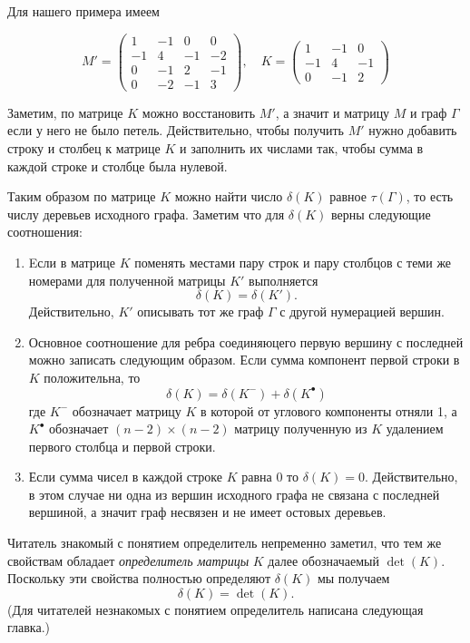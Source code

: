 \documentclass{article}
\begin{document}
Для нашего примера имеем

\[M'=\left(
\begin{matrix}
1&-1&0&0
\\
-1&4&-1&-2
\\
0&-1&2&-1
\\
0&-2&-1&3
\end{matrix}\right),
\quad 
K=\left(
\begin{matrix}
1&-1&0
\\
-1&4&-1
\\
0&-1&2
\end{matrix}
\right)\]

Заметим, по матрице $K$ можно восстановить $M'$, а значит и матрицу $M$ и граф $\Gamma$ если у него не было петель.
Действительно, чтобы получить $M'$ нужно добавить строку и столбец к матрице $K$ и заполнить их числами так, чтобы сумма в каждой строке и столбце была нулевой.

Таким образом по матрице $K$ можно найти число $\delta(K)$ равное $\tau(\Gamma)$, то есть числу деревьев исходного графа.
Заметим что для $\delta(K)$ верны следующие соотношения:
\begin{enumerate}
\item Eсли в матрице $K$ поменять местами пару строк и пару столбцов с теми же номерами
для полученной матрицы $K'$ выполняется 
\[\delta(K)=\delta(K').\]
Действительно, $K'$ описывать тот же граф $\Gamma$ с другой нумерацией вершин.
\item Основное соотношение для ребра соединяюцего первую вершину с последней можно записать следующим образом.
Если сумма компонент первой строки в $K$ положительна, то
\[\delta(K)=\delta(K^{-})+\delta(K^{\bullet})\]
где $K^{-}$ обозначает матрицу $K$ в которой от углового компоненты отняли 1, а $K^{\bullet}$ обозначает $(n-2)\times(n-2)$ матрицу полученную из $K$ удалением первого столбца и первой строки.
\item Если сумма чисел в каждой строке $K$ равна $0$ то $\delta(K)=0$. 
Действительно, в этом случае ни одна из вершин исходного графа не связана с последней вершиной, а значит граф несвязен и не имеет остовых деревьев.
\end{enumerate}

Читатель знакомый с понятием определитель непременно заметил, что
тем же свойствам обладает \emph{определитель матрицы} $K$ далее обозначаемый $\det(K)$.
Поскольку эти свойства полностью определяют $\delta(K)$ мы получаем 
\[\delta(K)=\det(K).\]
(Для читателей незнакомых с понятием определитель написана следующая главка.)
\end{document}
